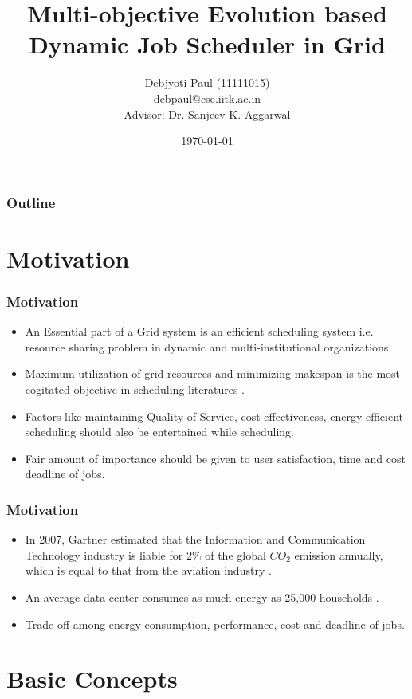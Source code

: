 \documentclass{beamer}
\title[Multi-objective Dynamic Job Scheduler in Grid]{Multi-objective Evolution based Dynamic Job Scheduler in Grid}
\author[Debjyoti Paul, debpaul@cse.iitk.ac.in]{Debjyoti Paul (11111015) \\debpaul@cse.iitk.ac.in\\Advisor: Dr. Sanjeev K. Aggarwal}
\institute{\\Department of Computer Science \& Engineering, \\Indian Institute of Technology, Kanpur}
\date{\today}
\begin{document}
\begin{frame}
\titlepage
\end{frame}
\begin{frame}
\frametitle{Outline}
\tableofcontents[shaded]
\end{frame}


\section[Motivation]{Motivation}
\begin{frame}[label=back1]
 \frametitle{Motivation}
\begin{itemize}
	\item An Essential part of a Grid system is an efficient scheduling system i.e. resource sharing problem in dynamic and multi-institutional organizations.
	\item Maximum utilization of grid resources and minimizing makespan is the most cogitated objective in scheduling literatures \hyperlink{supplement1}{}.
	\item Factors like maintaining Quality of Service, cost effectiveness, energy efficient scheduling should also be entertained while scheduling.
	\item Fair amount of importance should be given to user satisfaction, time and cost deadline of jobs.
\end{itemize}
\end{frame}

\begin{frame}
 \frametitle{Motivation}
\begin{itemize}
	\item In 2007, Gartner estimated that the Information and Communication Technology industry is liable for 2\% of the global $CO_2$ emission annually, which is equal to that from the aviation industry \cite{pettey2007gartner}.
	\item An average data center consumes as much energy as 25,000 households \cite{kaplan2008revolutionizing}.
	\item Trade off among energy consumption, performance, cost and deadline of jobs.
\end{itemize}
\end{frame}

\section[Basic Concepts]{Basic Concepts}
\end{document}
